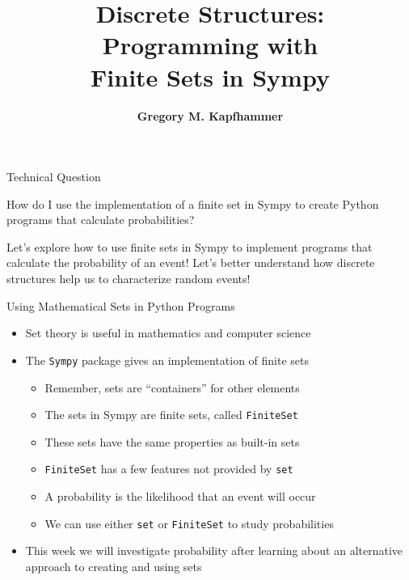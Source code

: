 \documentclass[14pt,aspectratio=169]{beamer}
\title{Discrete Structures: \\ Programming with \\ Finite Sets in Sympy}
\author{{\bf Gregory M. Kapfhammer}}
\institute[shortinst]{{\bf Department of Computer Science, Allegheny College}}
\begin{document}
{
  \begin{frame}
    \titlepage
  \end{frame}
}

%
\begin{frame}{Technical Question}
  \hspace*{.5in}
  \begin{minipage}{4.3in}
    \vspace*{.1in}
    \begin{center}
      {\large How do I use the implementation of a finite set in Sympy to
      create Python programs that calculate probabilities?}
    \end{center}
  \end{minipage}
  \vspace{2ex}
  \begin{center}
    \small Let's explore how to use finite sets in Sympy to implement programs
    that calculate the probability of an event! Let's better understand
    how discrete structures help us to characterize random events!
  \end{center}
\end{frame}

%
\begin{frame}{Using Mathematical Sets in Python Programs}
  \begin{itemize}
    \item Set theory is useful in mathematics and computer science
      \vspace*{-.15in}
    \item The {\tt Sympy} package gives an implementation of finite sets
      \begin{itemize}
        \item Remember, sets are ``containers'' for other elements
        \item The sets in Sympy are finite sets, called {\tt FiniteSet}
        \item These sets have the same properties as built-in sets
        \item {\tt FiniteSet} has a few features not provided by {\tt set}
        \item A probability is the likelihood that an event will occur
        \item We can use either {\tt set} or {\tt FiniteSet} to study
          probabilities
      \end{itemize}
      \vspace*{-.2in}
    \item This week we will investigate probability after learning about an
      alternative approach to creating and using sets
  \end{itemize}
\end{frame}
\end{document}
